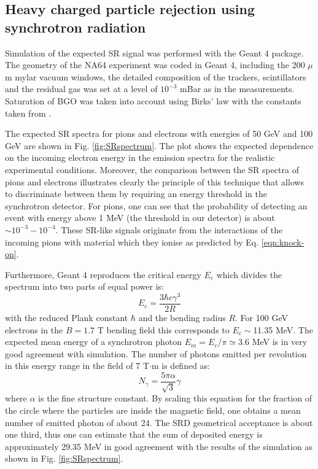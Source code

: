 \subsection{Heavy charged particle rejection using synchrotron radiation}
\label{ch3:sec:bkg-srd}

Simulation of the expected SR signal was performed with the Geant 4 package\cite{ALLISON2016186,1610988,AGOSTINELLI2003250}.
The geometry of the NA64 experiment was coded in Geant 4, including the 200 $\mu$m mylar vacuum windows, the detailed composition of the trackers, scintillators and the residual gas was set at a level of $10^{-3}$ mBar as in the measurements. Saturation of BGO was taken into account using Birks' law with the constants taken from \cite{AVDEICHIKOV2002251}.

The expected SR spectra for pions and electrons with energies of 50 GeV and 100 GeV are shown in Fig. \ref{fig:SRspectrum}. The plot shows the expected dependence on the incoming electron energy in the emission spectra for the realistic experimental conditions.
Moreover, the comparison between the SR spectra of pions and electrons illustrates clearly the principle of this technique that allows to discriminate between them by requiring an energy threshold in the synchrotron detector. 
For pions, one can see that the probability of detecting an event with energy above 1 MeV (the threshold in our detector) is about $\sim 10^{-3}-10^{-4}$.
These SR-like signals originate from the interactions of the incoming pions with material which they ionise as predicted by Eq. \ref{eqn:knock-on}.
 \par 
Furthermore, Geant 4 reproduces the critical energy $E_c$ which divides the spectrum into two parts of equal power is:
\begin{equation}
E_c = \frac{3 \hbar c \gamma^3}{2R}
\end{equation}
with the reduced Plank constant $\hbar$ and the bending radius $R$. 
 For 100 GeV electrons in the  $B=1.7$ T bending field this corresponds to $E_c\sim$11.35 MeV. The expected mean energy of a synchrotron photon $E_m=E_c/\pi\simeq 3.6$ MeV is in very good agreement with simulation. The number of photons emitted per revolution in this energy range in the field of 7 T$\cdot$m is defined as:
\begin{equation}
N_\gamma = \frac{5 \pi \alpha}{\sqrt{3}}\gamma
\end{equation}
where $\alpha$ is the fine structure constant. 
By scaling this equation for the fraction of the circle where the particles are inside the magnetic field, one obtains a mean number of emitted photon of about 24.
The SRD geometrical acceptance is about one third,  thus one can estimate that the sum of deposited energy is approximately 29.35 MeV in good agreement with the results of the simulation as shown in Fig. \ref{fig:SRspectrum}. 
 
